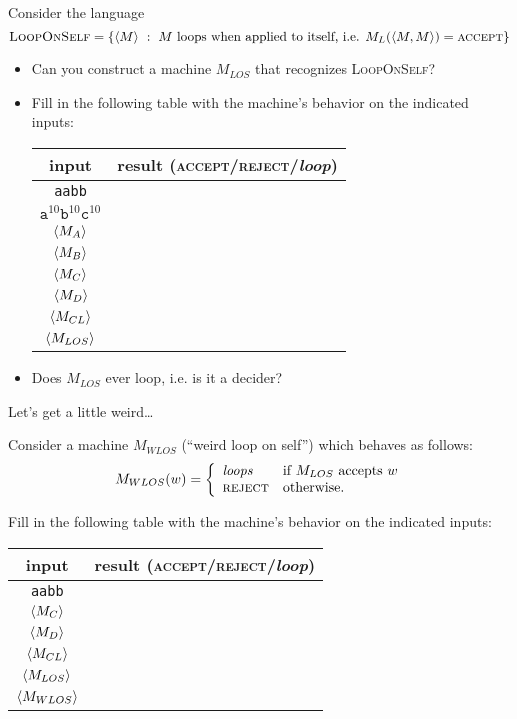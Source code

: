 \documentclass[twoside,letterpaper,openany]{book}
\begin{document}
\begin{exer2}
Consider the language
\[ \textsc{LoopOnSelf} = \left\lbrace {\langle{M}\rangle}\ :\ M~\textrm{loops when applied to itself, i.e. $M_L({\langle{M, M}\rangle}) = \textsc{accept}$} \right\rbrace \]
\begin{itemize}
\item Can you construct a machine $M_{LOS}$ that recognizes \textsc{LoopOnSelf}? 
\item Fill in the following table with the machine's behavior on the indicated inputs:
\begin{center}
\renewcommand{\arraystretch}{1.25}
\begin{tabular}[c]{c|c}
input & result (\textsc{accept}/\textsc{reject}/\textit{loop}) \\\hline
\texttt{aabb} & \\
$\texttt{a}^{10}\texttt{b}^{10}\texttt{c}^{10}$ & \\
${\langle{M_{A}}\rangle}$ & \\
${\langle{M_{B}}\rangle}$ & \\
${\langle{M_{C}}\rangle}$ & \\
${\langle{M_{D}}\rangle}$ & \\
${\langle{M_{CL}}\rangle}$ & \\
${\langle{M_{LOS}}\rangle}$ & \\
\end{tabular}
\end{center}

\item Does $M_{LOS}$ ever loop, i.e. is it a decider?
\end{itemize}
\end{exer2}

\begin{discussion}
Let's get a little weird\ldots
\end{discussion}

\begin{exer3}
Consider a machine $M_{WLOS}$ (``weird loop on self'') which behaves as follows:
\[ M_{WLOS}(w) = \bigg\{
\begin{array}{ll}
\textit{loops} &  \textrm{if $M_{LOS}$ accepts $w$} \\
\textsc{reject} & \textrm{otherwise.}
\end{array}
\]

Fill in the following table with the machine's behavior on the indicated inputs:
\begin{center}
\renewcommand{\arraystretch}{1.25}
\begin{tabular}[c]{c|c}
input & result (\textsc{accept}/\textsc{reject}/\textit{loop}) \\\hline
\texttt{aabb} & \\
${\langle{M_{C}}\rangle}$ & \\
${\langle{M_{D}}\rangle}$ & \\
${\langle{M_{CL}}\rangle}$ & \\
${\langle{M_{LOS}}\rangle}$ & \\
${\langle{M_{WLOS}}\rangle}$ & \\
\end{tabular}
\end{center}

\end{exer3}
\end{document}
